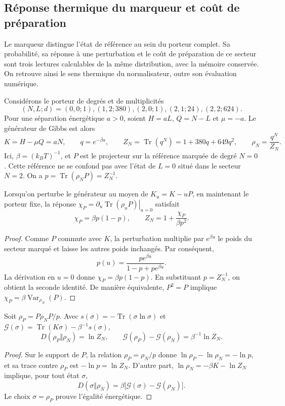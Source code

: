 \subsection{Réponse thermique du marqueur et coût de préparation}
\label{sec:termica-respuesta-preparacion-recuperada}

Le marqueur distingue l’état de référence au sein du porteur complet.
Sa probabilité, sa réponse à une perturbation et le coût de préparation de ce
secteur sont trois lectures calculables de la même distribution, avec la mémoire
conservée. On retrouve ainsi le sens thermique du normalisateur, outre
son évaluation numérique.

Considérons le porteur de degrés et de multiplicités
\[
 (N,L;d)=(0,0;1),(1,2;380),(2,0;1),(2,1;24),(2,2;624).
\]
Pour une séparation énergétique $a>0$, soient $H=aL$, $Q=N-L$ et
$\mu=-a$. Le générateur de Gibbs est alors
\[
 K=H-\mu Q=aN,\qquad q=e^{-\beta a},\qquad
 Z_N=\operatorname{Tr}(q^N)=1+380q+649q^2,
 \qquad \rho_N=\frac{q^N}{Z_N}.
\]
Ici, $\beta=(k_B T)^{-1}$, et $P$ est le projecteur sur la référence marquée
de degré $N=0$. Cette référence ne se confond pas avec l’état de $L=0$ situé
dans le secteur $N=2$. On a $p=\operatorname{Tr}(\rho_NP)=Z_N^{-1}$.

\begin{proposition}
Lorsqu’on perturbe le générateur au moyen de $K_u=K-uP$, en maintenant le porteur fixe,
la réponse $\chi_P=\left.\partial_u\operatorname{Tr}(\rho_uP)\right|_{u=0}$
satisfait
\[
 \chi_P=\beta p(1-p),\qquad
 Z_N=1+\frac{\chi_P}{\beta p^2}.
\]
\end{proposition}
\begin{proof}
Comme $P$ commute avec $K$, la perturbation multiplie par $e^{\beta u}$
le poids du secteur marqué et laisse les autres poids inchangés. Par conséquent,
\[
 p(u)=\frac{p e^{\beta u}}{1-p+p e^{\beta u}}.
\]
La dérivation en $u=0$ donne $\chi_P=\beta p(1-p)$. En substituant
$p=Z_N^{-1}$, on obtient la seconde identité. De manière équivalente,
$P^2=P$ implique $\chi_P=\beta\operatorname{Var}_{\rho_N}(P)$.
\end{proof}

\begin{proposition}
Soit $\rho_P=P\rho_NP/p$. Avec
$s(\sigma)=-\operatorname{Tr}(\sigma\ln\sigma)$ et
$\mathcal G(\sigma)=\operatorname{Tr}(K\sigma)-\beta^{-1}s(\sigma)$,
\[
 D(\rho_P\Vert\rho_N)=\ln Z_N,\qquad
 \mathcal G(\rho_P)-\mathcal G(\rho_N)=\beta^{-1}\ln Z_N.
\]
\end{proposition}
\begin{proof}
Sur le support de $P$, la relation $\rho_P=\rho_N/p$ donne
$\ln\rho_P-\ln\rho_N=-\ln p$, et sa trace contre $\rho_P$ est
$-\ln p=\ln Z_N$. D’autre part,
$\ln\rho_N=-\beta K-\ln Z_N$ implique, pour tout état $\sigma$,
\[
 D(\sigma\Vert\rho_N)
 =\beta\bigl[\mathcal G(\sigma)-\mathcal G(\rho_N)\bigr].
\]
Le choix $\sigma=\rho_P$ prouve l’égalité énergétique.
\end{proof}

